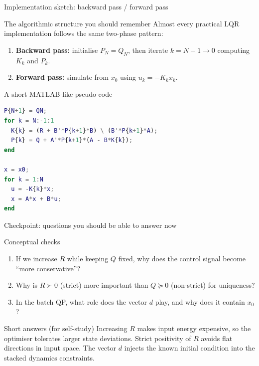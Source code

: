 \documentclass[aspectratio=169,11pt]{beamer}
\begin{document}
\begin{frame}[fragile]{Implementation sketch: backward pass / forward pass}
\begin{block}{The algorithmic structure you should remember}
Almost every practical LQR implementation follows the same two-phase pattern:
\begin{enumerate}
  \item \textbf{Backward pass:} initialise $P_N=Q_N$, then iterate $k=N-1\to 0$ computing $K_k$ and $P_k$.
  \item \textbf{Forward pass:} simulate from $x_0$ using $u_k=-K_kx_k$.
\end{enumerate}
\end{block}

\begin{exampleblock}{A short MATLAB-like pseudo-code}
\begin{lstlisting}[language=Matlab,basicstyle=\ttfamily\small]
P{N+1} = QN;
for k = N:-1:1
  K{k} = (R + B'*P{k+1}*B) \ (B'*P{k+1}*A);
  P{k} = Q + A'*P{k+1}*(A - B*K{k});
end

x = x0;
for k = 1:N
  u = -K{k}*x;
  x = A*x + B*u;
end
\end{lstlisting}
\end{exampleblock}
\end{frame}

\begin{frame}{Checkpoint: questions you should be able to answer now}
\begin{block}{Conceptual checks}
\begin{enumerate}
  \item If we increase $R$ while keeping $Q$ fixed, why does the control signal become ``more conservative''?
  \item Why is $R\succ 0$ (strict) more important than $Q\succeq 0$ (non-strict) for uniqueness?
  \item In the batch QP, what role does the vector $d$ play, and why does it contain $x_0$?
\end{enumerate}
\end{block}

\begin{alertblock}{Short answers (for self-study)}
Increasing $R$ makes input energy expensive, so the optimiser tolerates larger state deviations. Strict positivity of $R$ avoids flat directions in input space. The vector $d$ injects the known initial condition into the stacked dynamics constraints.
\end{alertblock}
\end{frame}
\end{document}
